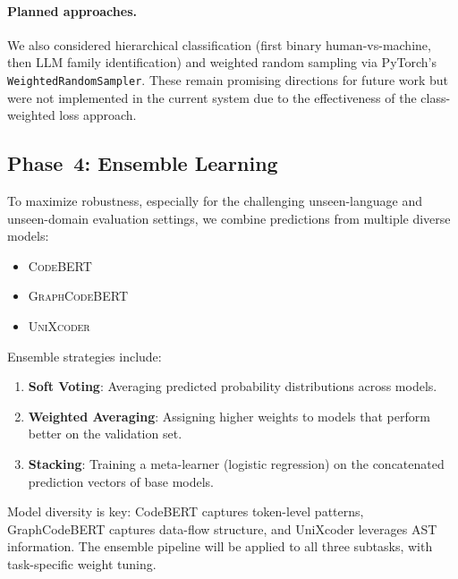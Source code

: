 \documentclass[11pt]{article}
\begin{document}
\paragraph{Planned approaches.} We also considered hierarchical classification (first binary human-vs-machine, then LLM family identification) and weighted random sampling via PyTorch's \texttt{WeightedRandomSampler}. These remain promising directions for future work but were not implemented in the current system due to the effectiveness of the class-weighted loss approach.

\subsection{Phase~4: Ensemble Learning}

To maximize robustness, especially for the challenging unseen-language and unseen-domain evaluation settings, we combine predictions from multiple diverse models:

\begin{itemize}
    \item \textsc{CodeBERT} \cite{feng-etal-2020-codebert}
    \item \textsc{GraphCodeBERT} \cite{guo2021graphcodebert}
    \item \textsc{UniXcoder} \cite{guo2022unixcoder}
\end{itemize}

Ensemble strategies include:
\begin{enumerate}
    \item \textbf{Soft Voting}: Averaging predicted probability distributions across models.
    \item \textbf{Weighted Averaging}: Assigning higher weights to models that perform better on the validation set.
    \item \textbf{Stacking}: Training a meta-learner (logistic regression) on the concatenated prediction vectors of base models.
\end{enumerate}

Model diversity is key: CodeBERT captures token-level patterns, GraphCodeBERT captures data-flow structure, and UniXcoder leverages AST information. The ensemble pipeline will be applied to all three subtasks, with task-specific weight tuning.
\end{document}
